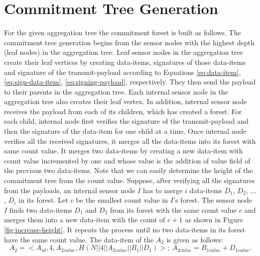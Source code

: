 \section{Commitment Tree Generation}
	For the given aggregation tree the commitment forest is built as follows.
	The commitment tree generation begins from the sensor nodes with the highest depth (leaf nodes) in the aggregation tree.
	Leaf sensor nodes in the aggregation tree create their leaf vertices by creating data-items, signatures of those data-items and signature of the transmit-payload according to Equations \ref{eq:data-item}, \ref{eq:sign-data-item}, \ref{eq:signing-payload}, respectively.
	They then send the payload to their parents in the aggregation tree.	
	Each internal sensor node in the aggregation tree also creates their leaf vertex.
	In addition, internal sensor node receives the payload from each of its children, which has created a forest.
	For each child, internal node first verifies the signature of the transmit-payload and then the signature of the data-item for one child at a time.
	Once internal node verifies all the received signatures, it merges all the data-items into its forest with same count value.
	It merges two data-items by creating a new data-item with count value incremented by one and whose value is the addition of value field of the previous two data-items. 
	Note that we can easily determine the height of the commitment tree from the count value.
	Suppose, after verifying all the signatures from the payloads, an internal sensor node $I$ has to merge $i$ data-items $D_{1}$, $D_{2}$, $\dotsc$, $D_{i}$ in its forest.
	Let $c$ be the smallest count value in $I$'s forest.
	The sensor node $I$ finds two data-items $D_{1}$ and $D_{2}$ from its forest with the same count value $c$ and merges them into a new data-item with the count of $c+1$ as shown in Figure \ref{fig:increase-height}.
	It repeats the process until no two data-items in its forest have the same count value.	
	The data-item of the $A_{2}$ is given as follows:
	\begin{equation*}
		A_{2} = <A_{id}, 4, A_{2value},H(N||4||A_{2value}||B_{1}||D_{1})>;\ A_{2value} = B_{1value} + D_{1value}. 
	\end{equation*}
	

